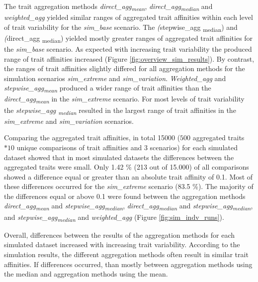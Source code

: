 \documentclass{article}
\begin{document}
The trait aggregation methods \textit{direct\_agg\textsubscript{mean}}, \textit{direct\_agg\textsubscript{median}} and \textit{weighted\_agg} yielded similar ranges of aggregated trait affinities within each level of trait variability for the \textit{sim\_base} scenario. The \textit(stepwise\_agg \textsubscript{median}) and \textit(direct\_agg \textsubscript{median}) yielded mostly greater ranges of aggregated trait affinities for the \textit{sim\_base} scenario. As expected with increasing trait variability the produced range of trait affinities increased (Figure \ref{fig:overview_sim_results}). By contrast, the ranges of trait affinities slightly differed for all aggregation methods for the simulation scenarios \textit{sim\_extreme} and \textit{sim\_variation}. \textit{Weighted\_agg} and \textit{stepwise\_agg\textsubscript{mean}} produced a wider range of trait affinities than the \textit{direct\_agg\textsubscript{mean}} in the \textit{sim\_extreme} scenario. For most levels of trait variability the \textit{stepwise\_agg \textsubscript{median}} resulted in the largest range of trait affinities in the \textit{sim\_extreme} and \textit{sim\_variation} scenarios.

Comparing the aggregated trait affinities, in total 15000 ($500$ aggregated traits $*10$ unique comparisons of trait affinities and $3$ scenarios) for each simulated dataset showed that in most simulated datasets the differences between the aggregated traits were small. Only 1.42 \% (213 out of 15.000) of all comparisons showed a difference equal or greater than an absolute trait affinity of 0.1. Most of these differences occurred for the \textit{sim\_extreme} scenario (83.5 \%). The majority of the differences equal or above 0.1 were found between the aggregation methods \textit{direct\_agg\textsubscript{mean}} and \textit{stepwise\_agg\textsubscript{median}}, \textit{direct\_agg\textsubscript{median}} and \textit{stepwise\_agg\textsubscript{median}}, and \textit{stepwise\_agg\textsubscript{median}} and \textit{weighted\_agg} (Figure \ref{fig:sim_indv_runs}). 

Overall, differences between the results of the aggregation methods for each simulated dataset increased with increasing trait variability. According to the simulation results, the different aggregation methods often result in similar trait affinities.  If differences occurred, than mostly between aggregation methods using the median and aggregation methods using the mean. 
\end{document}
